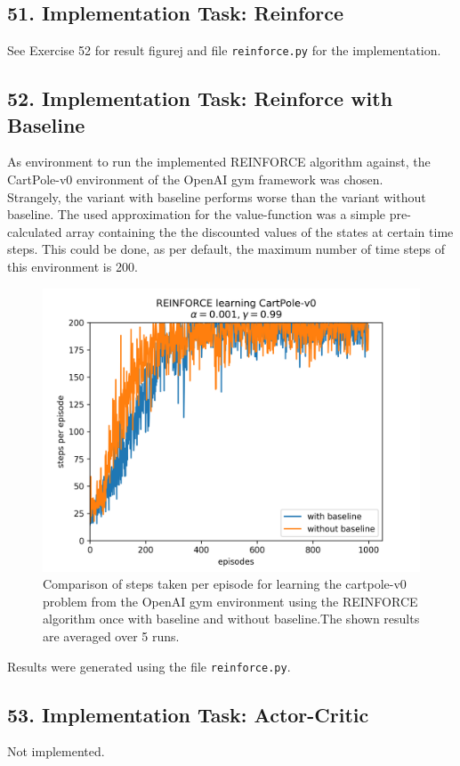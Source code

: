 \documentclass[10pt,a4paper]{article}
\begin{document}
\subsection*{51. Implementation Task: Reinforce}
See Exercise 52 for result figurej and file \texttt{reinforce.py} for the implementation.
\subsection*{52. Implementation Task: Reinforce with Baseline}
As environment to run the implemented REINFORCE algorithm against, the CartPole-v0 environment of the OpenAI gym framework was chosen.\\
Strangely, the variant with baseline performs worse than the variant without baseline. The used approximation for the value-function was a simple pre-calculated array containing the the discounted values of the states at certain time steps. This could be done, as per default, the maximum number of time steps of this environment is 200.
\begin{figure}[H]
\centering
\captionsetup{width=.5\linewidth}
\includegraphics[width=.5\linewidth]{./REINFORCE_cartpole.png}
\caption{Comparison of steps taken per episode for learning the cartpole-v0 problem from the OpenAI gym environment using the REINFORCE algorithm once with baseline and without baseline.The shown results are averaged over 5 runs.}
\end{figure}


Results were generated using the file \texttt{reinforce.py}.
\subsection*{53. Implementation Task: Actor-Critic}
Not implemented.
\end{document}
